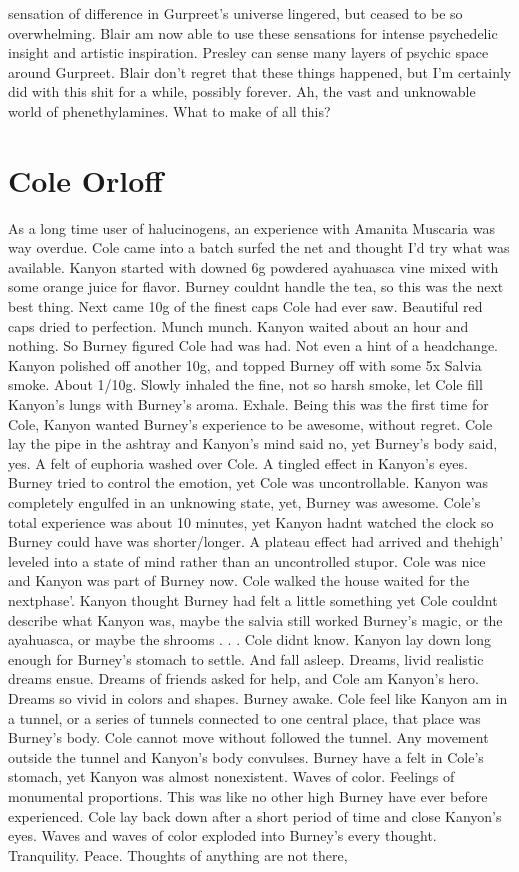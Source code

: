 \documentclass[12pt]{book}
\begin{document}
sensation of difference in Gurpreet's universe lingered, but ceased to be so overwhelming. Blair am now able to use these sensations for intense psychedelic insight and artistic inspiration. Presley can sense many layers of psychic space around Gurpreet. Blair don't regret that these things happened, but I'm certainly did with this shit for a while, possibly forever. Ah, the vast and unknowable world of phenethylamines. What to make of all this?



\chapter{Cole Orloff}

As a long time user of halucinogens, an experience with Amanita Muscaria was way overdue. Cole came into a batch surfed the net and thought I'd try what was available. Kanyon started with downed 6g powdered ayahuasca vine mixed with some orange juice for flavor. Burney couldnt handle the tea, so this was the next best thing. Next came 10g of the finest caps Cole had ever saw. Beautiful red caps dried to perfection. Munch munch. Kanyon waited about an hour and nothing. So Burney figured Cole had was had. Not even a hint of a headchange. Kanyon polished off another 10g, and topped Burney off with some 5x Salvia smoke. About 1/10g. Slowly inhaled the fine, not so harsh smoke, let Cole fill Kanyon's lungs with Burney's aroma. Exhale. Being this was the first time for Cole, Kanyon wanted Burney's experience to be awesome, without regret. Cole lay the pipe in the ashtray and Kanyon's mind said no, yet Burney's body said, yes. A felt of euphoria washed over Cole. A tingled effect in Kanyon's eyes. Burney tried to control the emotion, yet Cole was uncontrollable. Kanyon was completely engulfed in an unknowing state, yet, Burney was awesome. Cole's total experience was about 10 minutes, yet Kanyon hadnt watched the clock so Burney could have was shorter/longer. A plateau effect had arrived and thehigh' leveled into a state of mind rather than an uncontrolled stupor. Cole was nice and Kanyon was part of Burney now. Cole walked the house waited for the nextphase'. Kanyon thought Burney had felt a little something yet Cole couldnt describe what Kanyon was, maybe the salvia still worked Burney's magic, or the ayahuasca, or maybe the shrooms . . .  Cole didnt know. Kanyon lay down long enough for Burney's stomach to settle. And fall asleep. Dreams, livid realistic dreams ensue. Dreams of friends asked for help, and Cole am Kanyon's hero. Dreams so vivid in colors and shapes. Burney awake. Cole feel like Kanyon am in a tunnel, or a series of tunnels connected to one central place, that place was Burney's body. Cole cannot move without followed the tunnel. Any movement outside the tunnel and Kanyon's body convulses. Burney have a felt in Cole's stomach, yet Kanyon was almost nonexistent. Waves of color. Feelings of monumental proportions. This was like no other high Burney have ever before experienced. Cole lay back down after a short period of time and close Kanyon's eyes. Waves and waves of color exploded into Burney's every thought. Tranquility. Peace. Thoughts of anything are not there, 
\end{document}
